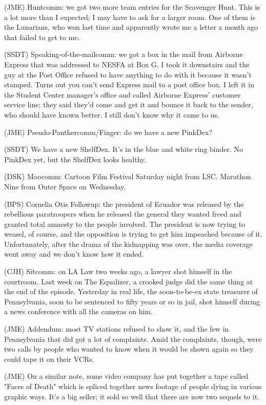 \documentclass[12pt]{article}
\begin{document}
(JME) Huntcomm: we got two more team entries for the Scavenger Hunt. This is a lot more than I expected; I may have to ask for a larger room. One of them is the Lunarians, who won last time and apparently wrote me a letter a month ago that failed to get to me.

(SSDT) Speaking-of-the-mailcomm: we got a box in the mail from Airborne Express that was addressed to NESFA at Box G. I took it downstairs and the guy at the Post Office refused to have anything to do with it because it wasn't stamped. Turns out you can't send Express mail to a post office box. I left it in the Student Center manager's office and called Airborne Express' customer service line; they said they'd come and get it and bounce it back to the sender, who should have known better. I still don't know why it came to us.

(JME) Pseudo-Panthercomm/Finger: do we have a new PinkDex?

(SSDT) We have a new ShelfDex. It's in the blue and white ring binder. No PinkDex yet, but the ShelfDex looks healthy.

(DSK) Moocomm: Cartoon Film Festival Saturday night from LSC. Marathon Nine from Outer Space on Wednesday.

(BPS) Cornelia Otis Followup: the president of Ecuador was released by the rebellious paratroopers when he released the general they wanted freed and granted total amnesty to the people involved. The president is now trying to weasel, of course, and the opposition is trying to get him impeached because of it. Unfortunately, after the drama of the kidnapping was over, the media coverage went away and we don't know how it ended.

(CJH) Sitcomm: on LA Law two weeks ago, a lawyer shot himself in the courtroom. Last week on The Equalizer, a crooked judge did the same thing at the end of the episode. Yesterday in real life, the soon-to-be-ex state treasurer of Pennsylvania, soon to be sentenced to fifty years or so in jail, shot himself during a news conference with all the cameras on him.

(JME) Addendum: most TV stations refused to show it, and the few in Pennsylvania that did got a lot of complaints. Amid the complaints, though, were two calls by people who wanted to know when it would be shown again so they could tape it on their VCRs.

(JME) On a similar note, some video company has put together a tape called "Faces of Death" which is spliced together news footage of people dying in various graphic ways. It's a big seller; it sold so well that there are now two sequels to it.
\end{document}
